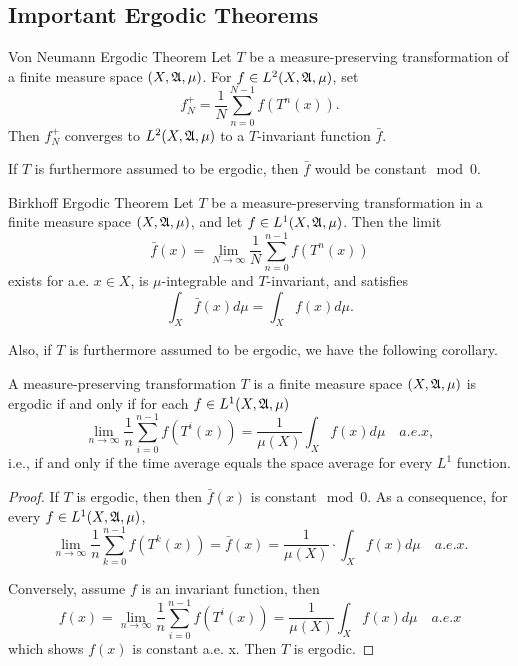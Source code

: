 \documentclass[12pt,a4paper]{article}
\begin{document}
	\subsection{Important Ergodic Theorems}
	\begin{theorem}{Von Neumann Ergodic Theorem}{}
		Let $T$ be a measure-preserving transformation of a finite measure space $(X,\mathfrak{A},\mu)$. For $f\in L^2(X,\mathfrak{A},\mu)$, set 
		$$
		f_N^+=\frac{1}{N}\sum_{n=0}^{N-1}f(T^n(x)).
		$$
		Then $f_N^+$ converges to $L^2(X,\mathfrak{A},\mu)$ to a $T$-invariant function $\bar{f}.$
	\end{theorem}
	If $T$ is furthermore assumed to be ergodic, then $\bar{f}$ would be constant$\mod 0$.
	\begin{theorem}{Birkhoff Ergodic Theorem}{}
		Let $T$ be a measure-preserving transformation in a finite measure space $(X,\mathfrak{A},\mu)$, and let $f\in L^1(X,\mathfrak{A},\mu)$. Then the limit
		$$
		\bar{f}(x)=\lim_{N\to\infty}\frac{1}{N}\sum_{n=0}^{n-1}f(T^n(x))
		$$
		exists for a.e. $x\in X$, is $\mu$-integrable and $T$-invariant, and satisfies
		$$
		\int_X \bar{f}(x)d\mu=\int_X f(x)d\mu.
		$$
	\end{theorem}
	Also, if $T$ is furthermore assumed to be ergodic, we have the following corollary.
	\begin{corollary}{}{}
		A measure-preserving transformation $T$ is a finite measure space $(X,\mathfrak{A},\mu)$ is ergodic if and only if for each $f\in L^1(X,\mathfrak{A},\mu)$
		$$
		\lim_{n\to\infty}\frac{1}{n}\sum_{i=0}^{n-1} f(T^i(x))=\frac{1}{\mu(X)}\int_X f(x)d\mu \quad a.e.x,
		$$
		i.e., if and only if the time average equals the space average for every $L^1$ function.
	\end{corollary}
	\begin{proof}
		If $T$ is ergodic, then  then $\bar{f}(x)$ is constant$\mod 0$. As a consequence, for every $f\in L^1(X,\mathfrak{A},\mu)$, 
		$$
		\lim_{n\to\infty}\frac{1}{n}\sum_{k=0}^{n-1}f(T^k(x))=\bar{f}(x)=\frac{1}{\mu(X)}\cdot \int_X f(x)d\mu \quad a.e. x.
		$$
		
		Conversely, assume $f$ is an invariant function, then
		$$
		f(x)=\lim_{n\to\infty}\frac{1}{n}\sum_{i=0}^{n-1} f(T^i(x))=\frac{1}{\mu(X)}\int_X f(x)d\mu \quad a.e.x
		$$
		which shows $f(x)$ is constant a.e. x. Then $T$ is ergodic.
	\end{proof}
	
\end{document}
